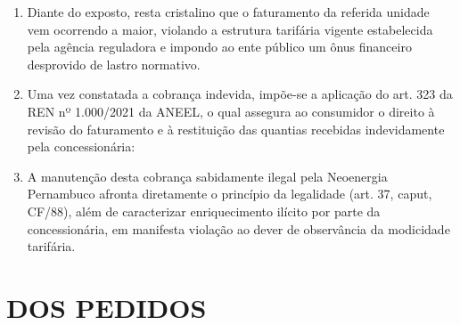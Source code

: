 \begin{enumerate}[resume]
\item Diante do exposto, resta cristalino que o faturamento da referida unidade vem ocorrendo a maior, violando a estrutura tarifária vigente estabelecida pela agência reguladora e impondo ao ente público um ônus financeiro desprovido de lastro normativo.

\item Uma vez constatada a cobrança indevida, impõe-se a aplicação do art. 323 da REN nº 1.000/2021 da ANEEL, o qual assegura ao consumidor o direito à revisão do faturamento e à restituição das quantias recebidas indevidamente pela concessionária:

\item A manutenção desta cobrança sabidamente ilegal pela Neoenergia Pernambuco afronta diretamente o princípio da legalidade (art. 37, caput, CF/88), além de caracterizar enriquecimento ilícito por parte da concessionária, em manifesta violação ao dever de observância da modicidade tarifária.
\end{enumerate}

\section{DOS PEDIDOS}

